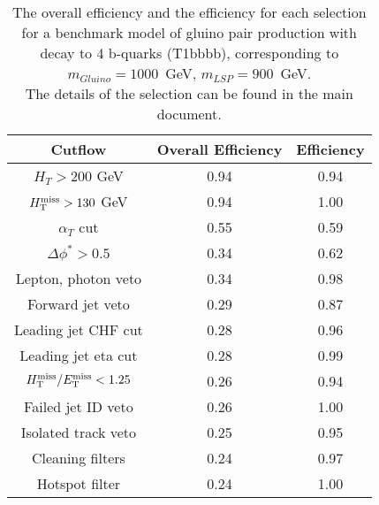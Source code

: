 \begin{longtable}{| c | c | c  | }
\caption{The overall efficiency and the efficiency for each selection for a benchmark model 
  of gluino pair production with decay to 4 b-quarks
  (T1bbbb), corresponding to $m_{Gluino} = 1000 $~GeV, $m_{LSP} = 900$~GeV. \\
  The details of the selection can be found in the main document. \label{tab:T1bbbb_1000_900}} \\    \hline 
\textbf{Cutflow} & \textbf{Overall Efficiency} & \textbf{Efficiency}\\ \hline 
$H_{T} > 200$ GeV & 0.94 & 0.94\\ \hline 
$H_{\rm T}^{\rm miss} > 130$ GeV & 0.94 & 1.00\\ \hline 
$\alpha_{T}$ cut & 0.55 & 0.59\\ \hline 
$\Delta\phi^{*} > 0.5$ & 0.34 & 0.62\\ \hline 
Lepton, photon veto & 0.34 & 0.98\\ \hline 
Forward jet veto & 0.29 & 0.87\\ \hline 
Leading jet CHF cut & 0.28 & 0.96\\ \hline 
Leading jet eta cut & 0.28 & 0.99\\ \hline 
$H_{\rm T}^{\rm miss} / E_{\rm T}^{\rm miss} < 1.25$ & 0.26 & 0.94\\ \hline 
Failed jet ID veto & 0.26 & 1.00\\ \hline 
Isolated track veto & 0.25 & 0.95\\ \hline 
Cleaning filters & 0.24 & 0.97\\ \hline 
Hotspot filter & 0.24 & 1.00\\ \hline 
    \hline 
    \hline 
\end{longtable}
